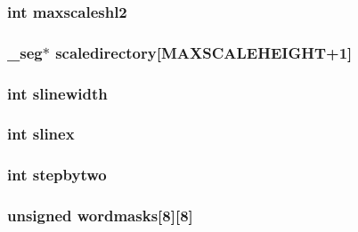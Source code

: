 \hypertarget{WL__SCALE_8C_ac10b61c2a588ba00d9ecda54429e0a9d}{
\subsubsection[{maxscaleshl2}]{\setlength{\rightskip}{0pt plus 5cm}int {\bf maxscaleshl2}}}
\label{WL__SCALE_8C_ac10b61c2a588ba00d9ecda54429e0a9d}
\hypertarget{WL__SCALE_8C_a79aa20f0658411ee8fe8706f15753026}{
\subsubsection[{scaledirectory}]{ \_\-seg$\ast$ {\bf scaledirectory}\mbox{[}MAXSCALEHEIGHT+1\mbox{]}}}
\label{WL__SCALE_8C_a79aa20f0658411ee8fe8706f15753026}
\hypertarget{WL__SCALE_8C_abd65d74dcd32e5501a3ecec638d65b0e}{
\subsubsection[{slinewidth}]{\setlength{\rightskip}{0pt plus 5cm}int {\bf slinewidth}}}
\label{WL__SCALE_8C_abd65d74dcd32e5501a3ecec638d65b0e}
\hypertarget{WL__SCALE_8C_aaec68c7e7f5e78b99df5b9ed716b35d2}{
\subsubsection[{slinex}]{\setlength{\rightskip}{0pt plus 5cm}int {\bf slinex}}}
\label{WL__SCALE_8C_aaec68c7e7f5e78b99df5b9ed716b35d2}
\hypertarget{WL__SCALE_8C_aa80a217b0adae9ee21e078108c9ef3c5}{
\subsubsection[{stepbytwo}]{\setlength{\rightskip}{0pt plus 5cm}int {\bf stepbytwo}}}
\label{WL__SCALE_8C_aa80a217b0adae9ee21e078108c9ef3c5}
\hypertarget{WL__SCALE_8C_a1c8053b1c5185cc1701015d26ca61eb0}{
\subsubsection[{wordmasks}]{\setlength{\rightskip}{0pt plus 5cm}unsigned {\bf wordmasks}\mbox{[}8\mbox{]}\mbox{[}8\mbox{]}}}
